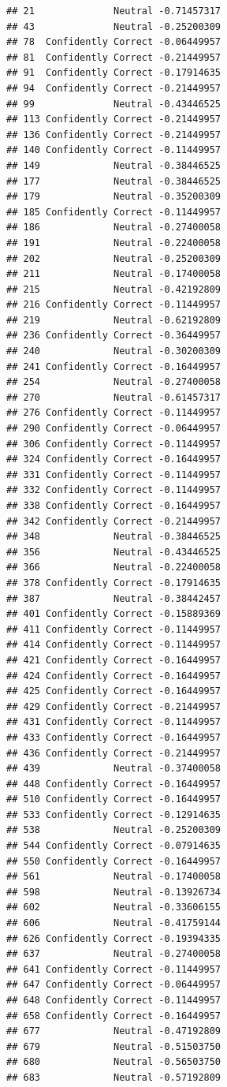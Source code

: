 \documentclass[
]{article}
\begin{document}
\begin{verbatim}
## 21              Neutral -0.71457317
## 43              Neutral -0.25200309
## 78  Confidently Correct -0.06449957
## 81  Confidently Correct -0.21449957
## 91  Confidently Correct -0.17914635
## 94  Confidently Correct -0.21449957
## 99              Neutral -0.43446525
## 113 Confidently Correct -0.21449957
## 136 Confidently Correct -0.21449957
## 140 Confidently Correct -0.11449957
## 149             Neutral -0.38446525
## 177             Neutral -0.38446525
## 179             Neutral -0.35200309
## 185 Confidently Correct -0.11449957
## 186             Neutral -0.27400058
## 191             Neutral -0.22400058
## 202             Neutral -0.25200309
## 211             Neutral -0.17400058
## 215             Neutral -0.42192809
## 216 Confidently Correct -0.11449957
## 219             Neutral -0.62192809
## 236 Confidently Correct -0.36449957
## 240             Neutral -0.30200309
## 241 Confidently Correct -0.16449957
## 254             Neutral -0.27400058
## 270             Neutral -0.61457317
## 276 Confidently Correct -0.11449957
## 290 Confidently Correct -0.06449957
## 306 Confidently Correct -0.11449957
## 324 Confidently Correct -0.16449957
## 331 Confidently Correct -0.11449957
## 332 Confidently Correct -0.11449957
## 338 Confidently Correct -0.16449957
## 342 Confidently Correct -0.21449957
## 348             Neutral -0.38446525
## 356             Neutral -0.43446525
## 366             Neutral -0.22400058
## 378 Confidently Correct -0.17914635
## 387             Neutral -0.38442457
## 401 Confidently Correct -0.15889369
## 411 Confidently Correct -0.11449957
## 414 Confidently Correct -0.11449957
## 421 Confidently Correct -0.16449957
## 424 Confidently Correct -0.16449957
## 425 Confidently Correct -0.16449957
## 429 Confidently Correct -0.21449957
## 431 Confidently Correct -0.11449957
## 433 Confidently Correct -0.16449957
## 436 Confidently Correct -0.21449957
## 439             Neutral -0.37400058
## 448 Confidently Correct -0.16449957
## 510 Confidently Correct -0.16449957
## 533 Confidently Correct -0.12914635
## 538             Neutral -0.25200309
## 544 Confidently Correct -0.07914635
## 550 Confidently Correct -0.16449957
## 561             Neutral -0.17400058
## 598             Neutral -0.13926734
## 602             Neutral -0.33606155
## 606             Neutral -0.41759144
## 626 Confidently Correct -0.19394335
## 637             Neutral -0.27400058
## 641 Confidently Correct -0.11449957
## 647 Confidently Correct -0.06449957
## 648 Confidently Correct -0.11449957
## 658 Confidently Correct -0.16449957
## 677             Neutral -0.47192809
## 679             Neutral -0.51503750
## 680             Neutral -0.56503750
## 683             Neutral -0.57192809
\end{verbatim}
\end{document}
